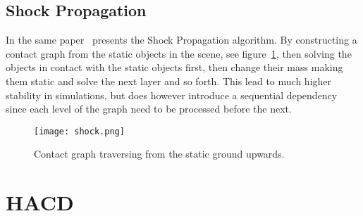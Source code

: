 \subsection{Shock Propagation}
In the same paper~\cite{guendelman} presents the Shock Propagation algorithm.
By constructing a contact graph from the static objects in the scene, see figure~\ref{fig:cont},
then solving the objects in contact with the static objects first, then change their
mass making them static and solve the next layer and so forth. This lead to much
higher stability in simulations, but does however introduce a sequential dependency
since each level of the graph need to be processed before the next.

\begin{figure}[H]
  \centering
  \texttt{[image: shock.png]}
  \caption{Contact graph traversing from the static ground upwards.}
  \label{fig:cont}
\end{figure}

\section{HACD}
